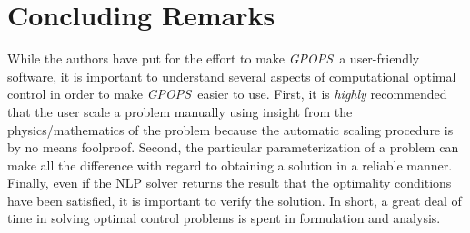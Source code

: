 \documentclass[10pt]{article}
\newcommand{\gpops}{{\em GPOPS}~}
\begin{document}
\begin{figure}[h]
\end{figure}

\clearpage

\section{Concluding Remarks}

While the authors have put for the effort to make \gpops a
user-friendly software, it is important to understand several aspects
of computational optimal control in order to make \gpops easier to
use.  First, it is {\em highly} recommended that the user scale a
problem manually using insight from the physics/mathematics of the
problem because the automatic scaling procedure is by no means
foolproof.  Second, the particular parameterization of a problem can
make all the difference with regard to obtaining a solution in a
reliable manner.  Finally, even if the NLP solver returns the result that the
optimality conditions have been satisfied, it is important to verify
the solution.  In short, a great deal of time in solving optimal
control problems is spent in formulation and analysis.



\end{document}
